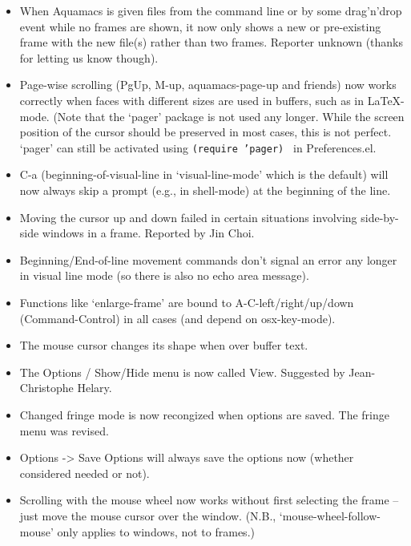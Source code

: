\begin{itemize}
\item When Aquamacs is given files from the command line or by some drag'n'drop event while no frames are shown, it now only shows a new or pre-existing frame with the new file(s) rather than two frames.
Reporter unknown (thanks for letting us know though).

\item Page-wise scrolling (PgUp, M-up, aquamacs-page-up and friends) now works correctly when faces with different sizes are used in buffers, such as in LaTeX-mode.  (Note that the `pager' package is not used any longer.  While the screen position of the cursor should be preserved in most cases, this is not perfect.  `pager' can still be activated using {\tt (require 'pager) } in Preferences.el.

\item C-a (beginning-of-visual-line in `visual-line-mode' which is the default) will now always skip a prompt (e.g., in shell-mode) at the beginning of the line.

\item Moving the cursor up and down failed in certain situations involving side-by-side windows in a frame.
Reported by Jin Choi.

\item Beginning/End-of-line movement commands don't signal an error any longer in visual line mode (so there is also no echo area message).

\item Functions like `enlarge-frame' are bound to A-C-left/right/up/down (Command-Control) in all cases (and depend on osx-key-mode).

\item The mouse cursor changes its shape when over buffer text.

\item The Options / Show/Hide menu is now called View.
Suggested by Jean-Christophe Helary.

\item Changed fringe mode is now recongized when options are saved.  The fringe menu was revised.

\item Options -> Save Options will always save the options now (whether considered needed or not).

\item Scrolling with the mouse wheel now works without first selecting the frame -- just move the mouse cursor over the window.  (N.B., `mouse-wheel-follow-mouse' only applies to windows, not to frames.)



\end{itemize}
